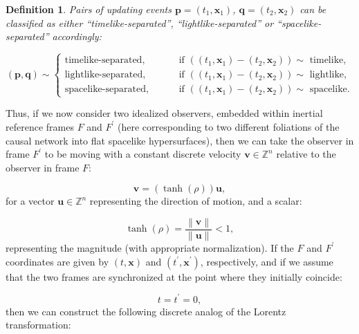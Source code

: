 \documentclass{article}
\newtheorem{definition}{Definition}
\begin{document}
\begin{definition}
Pairs of updating events ${\mathbf{p} = \left( t_1, \mathbf{x}_1 \right)}$, ${\mathbf{q} = \left( t_2, \mathbf{x}_2 \right)}$ can be classified as either ``timelike-separated'', ``lightlike-separated'' or ``spacelike-separated'' accordingly:

\begin{equation}
\left( \mathbf{p}, \mathbf{q} \right) \sim \begin{cases}
\text{timelike-separated}, \qquad &\text{ if } \left( \left( t_1, \mathbf{x}_1 \right) - \left( t_2, \mathbf{x}_2 \right) \right) \sim \text{ timelike},\\
\text{lightlike-separated}, \qquad &\text{ if } \left( \left( t_1, \mathbf{x}_1 \right) - \left( t_2, \mathbf{x}_2 \right) \right) \sim \text{ lightlike},\\
\text{spacelike-separated}, \qquad &\text{ if } \left( \left( t_1, \mathbf{x}_1 \right) - \left( t_2, \mathbf{x}_2 \right) \right) \sim \text{ spacelike}.
\end{cases}
\end{equation}
\end{definition}
Thus, if we now consider two idealized observers, embedded within inertial reference frames $F$ and ${F^{\prime}}$ (here corresponding to two different foliations of the causal network into flat spacelike hypersurfaces), then we can take the observer in frame ${F^{\prime}}$ to be moving with a constant discrete velocity ${\mathbf{v} \in \mathbb{Z}^n}$ relative to the observer in frame $F$:

\begin{equation}
\mathbf{v} = \left( \tanh \left( \rho \right) \right) \mathbf{u},
\end{equation}
for a vector ${\mathbf{u} \in \mathbb{Z}^{n}}$ representing the direction of motion, and a scalar:

\begin{equation}
\tanh \left( \rho \right) = \frac{\left\lVert \mathbf{v} \right\rVert}{\left\lVert \mathbf{u} \right\rVert} < 1,
\end{equation}
representing the magnitude (with appropriate normalization). If the $F$ and ${F^{\prime}}$ coordinates are given by ${\left( t, \mathbf{x} \right)}$ and ${\left( t^{\prime}, \mathbf{x}^{\prime} \right)}$, respectively, and if we assume that the two frames are synchronized at the point where they initially coincide:

\begin{equation}
t = t^{\prime} = 0,
\end{equation}
then we can construct the following discrete analog of the Lorentz transformation:
\end{document}
